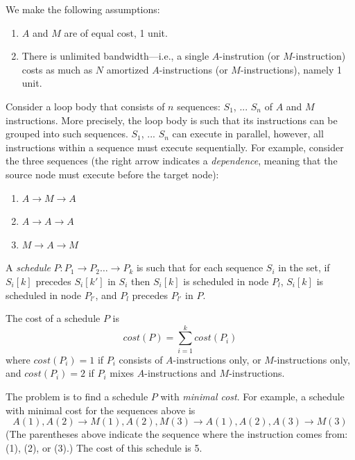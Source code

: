 \documentclass[sigconf, screen, natbib=false, dvipsnames, table]{acmart}
\theoremstyle{definition}
\begin{document}
We make the following assumptions:

\begin{enumerate}

\item $A$ and $M$ are of equal cost, 1 unit.
\item There is unlimited bandwidth---i.e., a single $A$-instrution (or $M$-instruction) costs as much as $N$ amortized $A$-instructions 
(or $M$-instructions), namely 1 unit.
 
\end{enumerate}

Consider a loop body that consists of $n$ sequences: $S_1$, ... $S_n$ of $A$ and $M$ instructions. 
More precisely, the loop body is such that its instructions can be grouped into such sequences. 
$S_1$, ... $S_n$ can execute in parallel, however, all instructions within a sequence must 
execute sequentially. For example, consider the three sequences (the right arrow indicates a \emph{dependence},
meaning that the source node must execute before the target node): 
\begin{enumerate}
\item $A \rightarrow M \rightarrow A$
\item $A \rightarrow A \rightarrow A$
\item $M \rightarrow A \rightarrow M$
\end{enumerate} 

A \emph{schedule} $P: P_1 \rightarrow P_2 \dots \rightarrow P_k$ is such that for each sequence 
$S_i$ in the set, if $S_i[k]$ precedes $S_i[k']$ in $S_i$ then $S_i[k]$ is scheduled in node $P_l$, $S_i[k]$ 
is scheduled in node $P_{l'}$, and $P_l$ precedes $P_{l'}$ in $P$. 

The cost of a schedule $P$ is 
\[\mathit{cost}(P) = \sum_{i=1}^k \mathit{cost}(P_i)\]
where $\mathit{cost}(P_i) = 1$ if $P_i$ consists of $A$-instructions only, or $M$-instructions only, 
and $\mathit{cost}(P_i) = 2$ if $P_i$ mixes $A$-instructions and $M$-instructions. 

The problem is to find a schedule $P$ with \emph{minimal cost}. For example, 
a schedule with minimal cost for the sequences above is
\[ A(1), A(2) \rightarrow M(1), A(2), M(3) \rightarrow A(1), A(2), A(3) \rightarrow M(3) \]
(The parentheses above indicate the sequence where the instruction comes from: (1), (2), or (3).)
The cost of this schedule is 5. 
\end{document}
